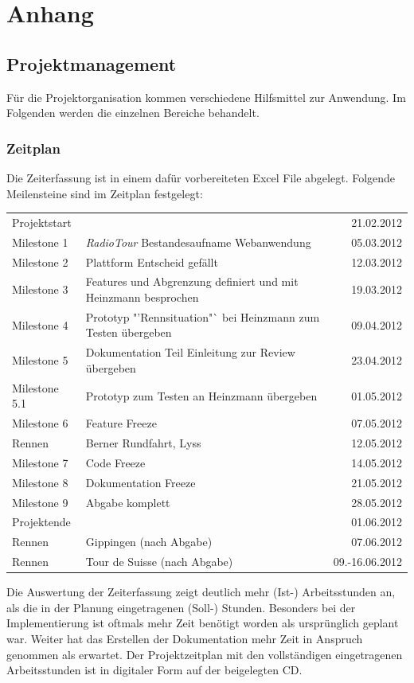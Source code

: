 \chapter{Anhang}

\section{Projektmanagement}
Für die Projektorganisation kommen verschiedene Hilfsmittel zur Anwendung. Im Folgenden werden die einzelnen Bereiche behandelt.

\subsection{Zeitplan}
Die Zeiterfassung ist in einem dafür vorbereiteten Excel File abgelegt. Folgende Meilensteine sind im Zeitplan festgelegt:

\begin{tabular}{p{2.1cm}p{7.5cm}r}
Projektstart & & 21.02.2012\\
Milestone 1 & \textit{RadioTour} Bestandesaufname Webanwendung & 05.03.2012\\
Milestone 2 & Plattform Entscheid gefällt & 12.03.2012\\
Milestone 3 & Features und Abgrenzung definiert und mit Heinzmann besprochen & 19.03.2012\\
Milestone 4 & Prototyp "'Rennsituation"` bei Heinzmann zum Testen übergeben & 09.04.2012\\
Milestone 5 & Dokumentation Teil Einleitung zur Review übergeben & 23.04.2012\\
Milestone 5.1 & Prototyp zum Testen an Heinzmann übergeben & 01.05.2012\\
Milestone 6 & Feature Freeze & 07.05.2012\\
Rennen & Berner Rundfahrt, Lyss & 12.05.2012\\
Milestone 7 & Code Freeze & 14.05.2012\\
Milestone 8 & Dokumentation Freeze & 21.05.2012\\
Milestone 9 & Abgabe komplett & 28.05.2012\\
Projektende & & 01.06.2012\\
Rennen & Gippingen (nach Abgabe) & 07.06.2012\\
Rennen & Tour de Suisse (nach Abgabe) & 09.-16.06.2012\\
\end{tabular}

Die Auswertung der Zeiterfassung zeigt deutlich mehr (Ist-) Arbeitsstunden an, als die in der Planung eingetragenen (Soll-) Stunden. Besonders bei der Implementierung ist oftmals mehr Zeit benötigt worden als ursprünglich geplant war. Weiter hat das Erstellen der Dokumentation  mehr Zeit in Anspruch genommen als erwartet. Der Projektzeitplan mit den vollständigen eingetragenen Arbeitsstunden ist in digitaler Form auf der beigelegten CD.

